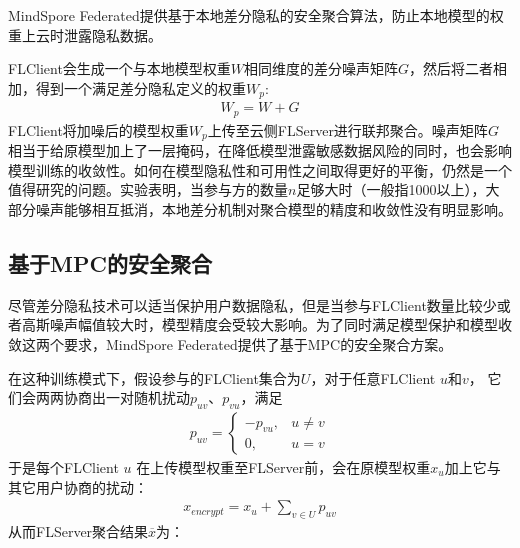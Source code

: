 \documentclass[letterpaper,10pt,english]{sphinxmanual}
\begin{document}
\sphinxAtStartPar
MindSpore
Federated提供基于本地差分隐私的安全聚合算法，防止本地模型的权重上云时泄露隐私数据。

\sphinxAtStartPar
FL\sphinxhyphen{}Client会生成一个与本地模型权重\(W\)相同维度的差分噪声矩阵\(G\)，然后将二者相加，得到一个满足差分隐私定义的权重\(W_p\):
\begin{equation}\label{equation:chapter_federated_learning/privacy_encryption_algorithm:chapter_federated_learning/privacy_encryption_algorithm:1}
\begin{split}W_p=W+G\end{split}
\end{equation}
\sphinxAtStartPar
FL\sphinxhyphen{}Client将加噪后的模型权重\(W_p\)上传至云侧FL\sphinxhyphen{}Server进行联邦聚合。噪声矩阵\(G\)相当于给原模型加上了一层掩码，在降低模型泄露敏感数据风险的同时，也会影响模型训练的收敛性。如何在模型隐私性和可用性之间取得更好的平衡，仍然是一个值得研究的问题。实验表明，当参与方的数量\(n\)足够大时（一般指1000以上），大部分噪声能够相互抵消，本地差分机制对聚合模型的精度和收敛性没有明显影响。


\subsection{基于MPC的安全聚合}
\label{\detokenize{chapter_federated_learning/privacy_encryption_algorithm:mpc}}
\sphinxAtStartPar
尽管差分隐私技术可以适当保护用户数据隐私，但是当参与FL\sphinxhyphen{}Client数量比较少或者高斯噪声幅值较大时，模型精度会受较大影响。为了同时满足模型保护和模型收敛这两个要求，MindSpore
Federated提供了基于MPC的安全聚合方案。

\sphinxAtStartPar
在这种训练模式下，假设参与的FL\sphinxhyphen{}Client集合为\(U\)，对于任意FL\sphinxhyphen{}Client
\(u\)和\(v\)，
它们会两两协商出一对随机扰动\(p_{uv}\)、\(p_{vu}\)，满足
\begin{equation}\label{equation:chapter_federated_learning/privacy_encryption_algorithm:chapter_federated_learning/privacy_encryption_algorithm:2}
\begin{split}\label{puv}
    p_{uv}=
    \begin{cases}
    -p_{vu}, &u{\neq}v\\
    0, &u=v
    \end{cases}\end{split}
\end{equation}
\sphinxAtStartPar
于是每个FL\sphinxhyphen{}Client \(u\)
在上传模型权重至FL\sphinxhyphen{}Server前，会在原模型权重\(x_u\)加上它与其它用户协商的扰动：
\begin{equation}\label{equation:chapter_federated_learning/privacy_encryption_algorithm:chapter_federated_learning/privacy_encryption_algorithm:3}
\begin{split}x_{encrypt}=x_u+\sum\limits_{v{\in}U}p_{uv}\end{split}
\end{equation}
\sphinxAtStartPar
从而FL\sphinxhyphen{}Server聚合结果\(\overline{x}\)为：
\end{document}
